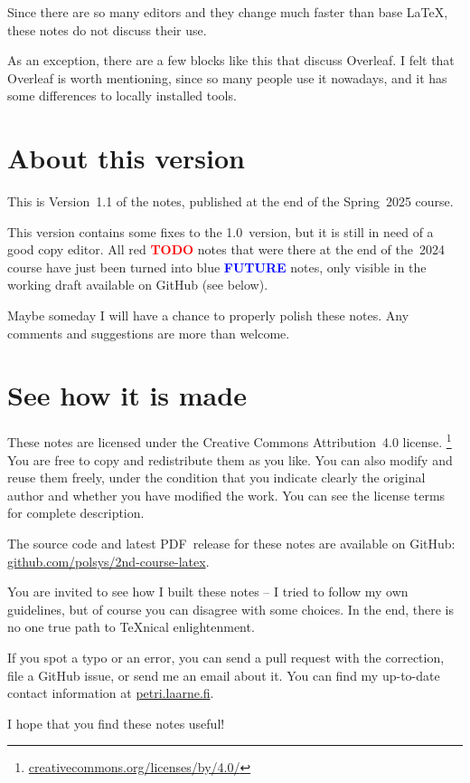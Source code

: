 Since there are so many editors and they change much faster than base \LaTeX,
these notes do not discuss their use.

\begin{overleaf}
As an exception, there are a few blocks like this that discuss Overleaf.
I felt that Overleaf is worth mentioning, since so many people use it nowadays,
and it has some differences to locally installed tools.
\end{overleaf}


%
%
\section{About this version}

This is Version~1.1 of the notes, published at the end of the Spring~2025 course.

This version contains some fixes to the 1.0~version,
but it is still in need of a good copy editor.
All red \textcolor{red}{\textbf{TODO}} notes that were there at the end of the~2024 course
have just been turned into blue \textcolor{blue}{\textbf{FUTURE}} notes,
only visible in the working draft available on GitHub (see below).


Maybe someday I will have a chance to properly polish these notes.
Any comments and suggestions are more than welcome.



%
%
\section{See how it is made}

\noindent{\Huge\faCreativeCommons\faCreativeCommonsBy}
These notes are licensed under the Creative Commons Attribution~4.0 license.%
\footnote{\url{creativecommons.org/licenses/by/4.0/}}
You are free to copy and redistribute them as you like.
You can also modify and reuse them freely,
under the condition that you indicate clearly the original author
and whether you have modified the work.
You can see the license terms for complete description.

\bigskip\noindent{\huge\faGithub}
The source code and latest PDF~release for these notes are available on GitHub:
\url{github.com/polsys/2nd-course-latex}.

You are invited to see how I built these notes
-- I tried to follow my own guidelines, but of course you can disagree with some choices.
In the end, there is no one true path to \TeX nical enlightenment.

If you spot a typo or an error, you can send a pull request with the correction,
file a GitHub issue, or send me an email about it.
You can find my up-to-date contact information at \url{petri.laarne.fi}.

\bigskip\noindent
I hope that you find these notes useful!
